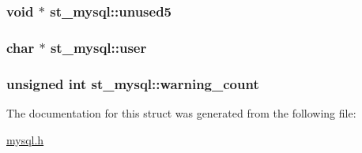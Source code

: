 \subsubsection[{unused5}]{\setlength{\rightskip}{0pt plus 5cm}void $\ast$ st\+\_\+mysql\+::unused5}\label{structst__mysql_af3adab90c86872eff4b923469b459749}
\hypertarget{structst__mysql_ad5bf53f25b64492bee18c140c11081b6}{}
\subsubsection[{user}]{\setlength{\rightskip}{0pt plus 5cm}char $\ast$ st\+\_\+mysql\+::user}\label{structst__mysql_ad5bf53f25b64492bee18c140c11081b6}
\hypertarget{structst__mysql_a397568fcafb4431f45aaddce083d680e}{}
\subsubsection[{warning\+\_\+count}]{\setlength{\rightskip}{0pt plus 5cm}unsigned int st\+\_\+mysql\+::warning\+\_\+count}\label{structst__mysql_a397568fcafb4431f45aaddce083d680e}


The documentation for this struct was generated from the following file\+:\begin{DoxyCompactItemize}
\item 
\hyperlink{mysql_8h}{mysql.\+h}\end{DoxyCompactItemize}
